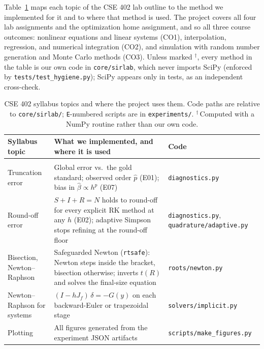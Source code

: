 \label{sec:course}
Table~\ref{tab:course} maps each topic of the CSE 402 lab outline to the method we implemented
for it and to where that method is used. The project covers all four lab assignments and the
optimization home assignment, and so all three course outcomes: nonlinear equations and linear
systems (CO1), interpolation, regression, and numerical integration (CO2), and simulation with
random number generation and Monte Carlo methods (CO3). Unless marked $^\dagger$, every method in
the table is our own code in \texttt{core/sirlab}, which never imports SciPy (enforced by
\texttt{tests/test\_hygiene.py}); SciPy appears only in tests, as an independent cross-check.

\begin{table}[tp]
  \centering
  \footnotesize
  \caption{CSE 402 syllabus topics and where the project uses them. Code paths are relative to
    \texttt{core/sirlab/}; \texttt{E}-numbered scripts are in \texttt{experiments/}.
    $^\dagger$\,Computed with a NumPy routine rather than our own code.}
  \label{tab:course}
  \begin{tabularx}{\textwidth}{@{}>{\raggedright\arraybackslash}p{2.7cm}
      >{\raggedright\arraybackslash}X >{\raggedright\arraybackslash}p{3.5cm}@{}}
    \toprule
    Syllabus topic & What we implemented, and where it is used & Code \\
    \midrule
    \multicolumn{3}{@{}l}{\textbf{Lab 1: approximations, errors, and root finding (CO1)}} \\
    Truncation error & Global error vs.\ the gold standard; observed order $\hat p$ (E01); bias in
      $\hat\beta \propto h^p$ (E07) & \texttt{diagnostics.py} \\
    Round-off error & $S+I+R=N$ holds to round-off for every explicit RK method at any $h$ (E02);
      adaptive Simpson stops refining at the round-off floor
      & \texttt{diagnostics.py}, \texttt{quadrature/adaptive.py} \\
    Bisection, Newton--Raphson & Safeguarded Newton (\texttt{rtsafe}): Newton steps inside the
      bracket, bisection otherwise; inverts $t(R)$ and solves the final-size equation
      & \texttt{roots/newton.py} \\
    Newton--Raphson for systems & $(I - hJ_f)\,\delta = -G(y)$ on each backward-Euler or
      trapezoidal stage & \texttt{solvers/implicit.py} \\
    Plotting & All figures generated from the experiment JSON artifacts
      & \texttt{scripts/make\_figures.py} \\

\end{tabularx}
\end{table}
